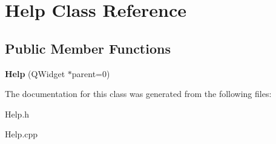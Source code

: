 \hypertarget{classHelp}{\section{\-Help \-Class \-Reference}
\label{classHelp}
}
\subsection*{\-Public \-Member \-Functions}
\begin{DoxyCompactItemize}
\item 
\hypertarget{classHelp_a7359f816eb2dab34e4c7017e36c9654d}{{\bfseries \-Help} (\-Q\-Widget $\ast$parent=0)}\label{classHelp_a7359f816eb2dab34e4c7017e36c9654d}

\end{DoxyCompactItemize}


\-The documentation for this class was generated from the following files\-:\begin{DoxyCompactItemize}
\item 
\-Help.\-h\item 
\-Help.\-cpp\end{DoxyCompactItemize}
